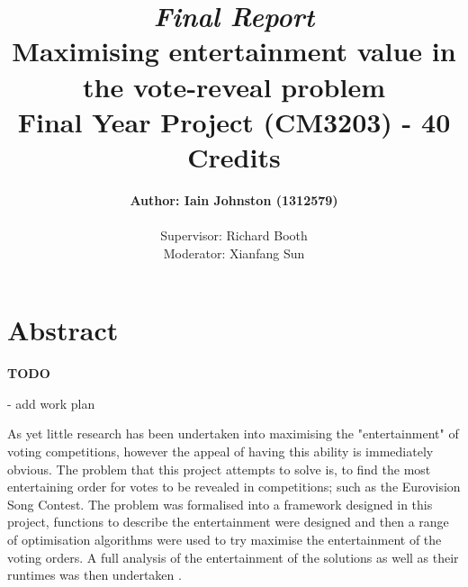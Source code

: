 \documentclass[12pt]{report}
\title{\textit{Final Report}\\\textbf{Maximising entertainment value in the vote-reveal problem}\\ Final Year Project (CM3203) - 40 Credits}
\author{\textbf{Author: Iain Johnston (1312579)} \\ \\ Supervisor: Richard Booth\\ Moderator: Xianfang Sun}
\date{} %
\begin{document}
\maketitle
\clearpage

\section*{Abstract}
\textbf{TODO}

- add work plan


As yet little research has been undertaken into maximising the "entertainment" of voting competitions, however the appeal of having this ability is immediately obvious.
The problem that this project attempts to solve is, to find the most entertaining order for votes to be revealed in competitions; such as the Eurovision Song Contest.
The problem was formalised into a framework designed in this project, functions to describe the entertainment were designed and then a range of optimisation algorithms were used to try maximise the entertainment of the voting orders. A full analysis of the entertainment of the solutions as well as their runtimes was then undertaken .
\end{document}
